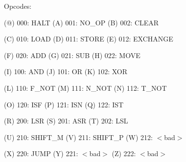 \documentclass[12pt]{article}
\begin{document}
Opcodes:

    (@) 000: HALT
    (A) 001: NO\_OP
    (B) 002: CLEAR

    (C) 010: LOAD
    (D) 011: STORE
    (E) 012: EXCHANGE

    (F) 020: ADD
    (G) 021: SUB
    (H) 022: MOVE

    (I) 100: AND
    (J) 101: OR
    (K) 102: XOR

    (L) 110: F\_NOT
    (M) 111: N\_NOT
    (N) 112: T\_NOT

    (O) 120: ISF
    (P) 121: ISN
    (Q) 122: IST

    (R) 200: LSR
    (S) 201: ASR
    (T) 202: LSL

    (U) 210: SHIFT\_M
    (V) 211: SHIFT\_P
    (W) 212: $<$bad$>$

    (X) 220: JUMP
    (Y) 221: $<$bad$>$
    (Z) 222: $<$bad$>$

%

%

%

%
\end{document}
